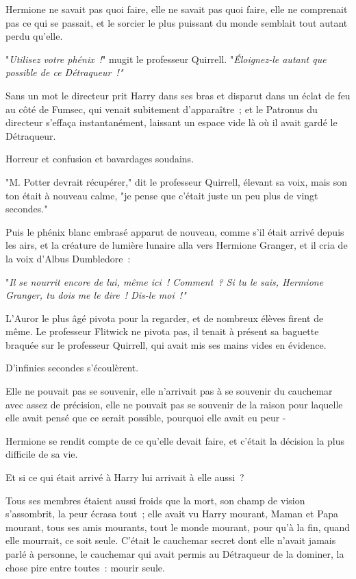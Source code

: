 Hermione ne savait pas quoi faire, elle ne savait pas quoi faire, elle ne comprenait pas ce qui se passait, et le sorcier le plus puissant du monde semblait tout autant perdu qu'elle.

"\emph{Utilisez votre phénix~!}" mugit le professeur Quirrell. "\emph{Éloignez-le autant que possible de ce Détraqueur~!"}

Sans un mot le directeur prit Harry dans ses bras et disparut dans un éclat de feu au côté de Fumsec, qui venait subitement d'apparaître~; et le Patronus du directeur s'effaça instantanément, laissant un espace vide là où il avait gardé le Détraqueur.

Horreur et confusion et bavardages soudains.

"M. Potter devrait récupérer," dit le professeur Quirrell, élevant sa voix, mais son ton était à nouveau calme, "je pense que c'était juste un peu plus de vingt secondes."

Puis le phénix blanc embrasé apparut de nouveau, comme s'il était arrivé depuis les airs, et la créature de lumière lunaire alla vers Hermione Granger, et il cria de la voix d'Albus Dumbledore~:

"\emph{Il se nourrit encore de lui, même ici~! Comment~? Si tu le sais, Hermione Granger, tu dois me le dire~! Dis-le moi~!"}

L'Auror le plus âgé pivota pour la regarder, et de nombreux élèves firent de même. Le professeur Flitwick ne pivota pas, il tenait à présent sa baguette braquée sur le professeur Quirrell, qui avait mis ses mains vides en évidence.

D'infinies secondes s'écoulèrent.

Elle ne pouvait pas se souvenir, elle n'arrivait pas à se souvenir du cauchemar avec assez de précision, elle ne pouvait pas se souvenir de la raison pour laquelle elle avait pensé que ce serait possible, pourquoi elle avait eu peur -

Hermione se rendit compte de ce qu'elle devait faire, et c'était la décision la plus difficile de sa vie.

Et si ce qui était arrivé à Harry lui arrivait à elle aussi~?

Tous ses membres étaient aussi froids que la mort, son champ de vision s'assombrit, la peur écrasa tout~; elle avait vu Harry mourant, Maman et Papa mourant, tous ses amis mourants, tout le monde mourant, pour qu'à la fin, quand elle mourrait, ce soit seule. C'était le cauchemar secret dont elle n'avait jamais parlé à personne, le cauchemar qui avait permis au Détraqueur de la dominer, la chose pire entre toutes~: mourir seule.

